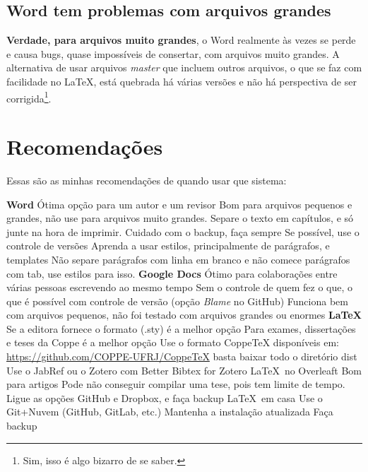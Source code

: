 \subsection{Word tem problemas com arquivos grandes}

\textbf{Verdade, para arquivos muito grandes}, o Word realmente às vezes se perde e causa bugs, quase impossíveis de consertar, com arquivos muito grandes. A alternativa de usar arquivos \textit{master} que incluem outros arquivos, o que se faz com facilidade no \LaTeX, está quebrada há várias versões e não há perspectiva de ser corrigida\footnote{Sim, isso é algo bizarro de se saber.}.

\section{Recomendações}

Essas são as minhas recomendações de quando usar que sistema:

\begin{outline} 
    \1 \textbf{Word}
    \2 Ótima opção para um autor e um revisor
    \2 Bom para arquivos pequenos e grandes, não use para arquivos muito grandes.
    \2 Separe o texto em capítulos, e só junte na hora de imprimir.
    \2 Cuidado com o backup, faça sempre
    \2 Se possível, use o controle de versões
    \2 Aprenda a usar estilos, principalmente de parágrafos, e templates
    \2 Não separe parágrafos com linha em branco e não comece parágrafos com tab, use estilos para isso.
    \1 \textbf{Google Docs}
    \2 Ótimo para colaborações entre várias pessoas escrevendo ao mesmo tempo
    \2 Sem o controle de quem fez o que, o que é possível com controle de versão (opção \textit{Blame} no GitHub)
    \2 Funciona bem com arquivos pequenos, não foi testado com arquivos grandes ou enormes
    \1 \textbf{\LaTeX}
    \2 Se a editora fornece o formato (.sty) é a melhor opção
    \2 Para exames, dissertações e teses da Coppe é a melhor opção
    \3 Use o formato CoppeTeX disponíveis em: \url{https://github.com/COPPE-UFRJ/CoppeTeX}
    \3 basta baixar todo o diretório dist 
    \2 Use o JabRef ou o Zotero com Better Bibtex for Zotero
    \2 \LaTeX\ no Overleaft
    \3 Bom para artigos
    \3 Pode não conseguir compilar uma tese, pois tem limite de tempo.
    \3 Ligue as opções GitHub e Dropbox, e faça backup
    \2 \LaTeX\ em casa
    \3 Use o Git+Nuvem (GitHub, GitLab, etc.)
    \3 Mantenha a instalação atualizada
    \3 Faça backup
\end{outline}








